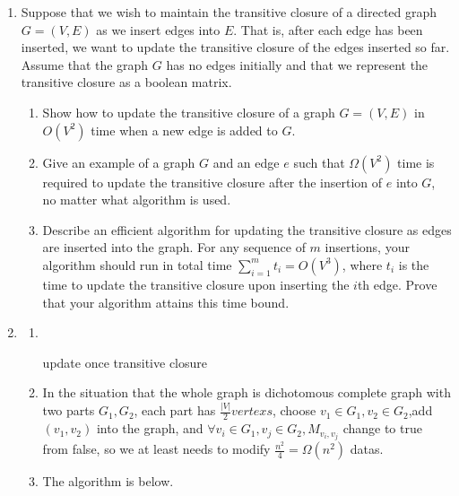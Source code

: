 \documentclass[12pt,a4paper]{article}
\makeatletter
\newtheorem*{solution}{Solution}
\theoremstyle{definition}
\renewenvironment{solution}[1][Solution] {\par\pushQED{\qed}\normalfont\topsep6\p@\@plus6\p@\relax\trivlist\item[\hskip\labelsep\bfseries#1\@addpunct{.}]\ignorespaces}{\popQED\endtrivlist\@endpefalse} \makeatother
\makeatother
\begin{document}
\begin{enumerate}
	\item Suppose that we wish to maintain the transitive closure of a directed graph $G=(V,E)$ as we insert edges into $E$. That is, after each edge has been inserted, we want to update the transitive closure of the edges inserted so far. Assume that the graph $G$ has no edges initially and that we represent the transitive closure as a boolean matrix.
	\begin{enumerate}
	    \item Show how to update the transitive closure of a graph $G=(V,E)$ in $O(V^2)$ time when a new edge is added to $G$.
	    \item Give an example of a graph $G$ and an edge $e$ such that $\Omega(V^2)$ time is required to update the transitive closure after the insertion of $e$ into $G$, no matter what algorithm is used.
	    \item Describe an efficient algorithm for updating the transitive closure as edges are inserted into the graph. For any sequence of $m$ insertions, your algorithm should run in total time $\sum_{i=1}^m t_i=O(V^3)$, where $t_i$ is the time to update the transitive closure upon inserting the $i$th edge. Prove that your algorithm attains this time bound.
	\end{enumerate}
	\begin{solution}
	\begin{enumerate}
	    \item 
	~\par
	 \begin{algorithm}[H]
    \caption{update once transitive closure}\label{transitive}
	\end{algorithm}
	\item
	In the situation that the whole graph is dichotomous complete graph with two parts $G_1,G_2$, each part has $\frac{|V|}{2} vertexs$, choose $v_1\in G_1,v_2\in G_2$,add $(v_1,v_2)$ into the graph, and $\forall v_i\in G_1,v_j\in G_2,M_{v_i,v_j}$ change to true from false, so we at least needs to modify $\frac{n^2}{4}=\Omega(n^2)$ datas.
	\item
	\par The algorithm is below.\\
		\begin{algorithm}[H]

\end{algorithm}
\end{enumerate}
\end{solution}
\end{enumerate}
\end{document}
